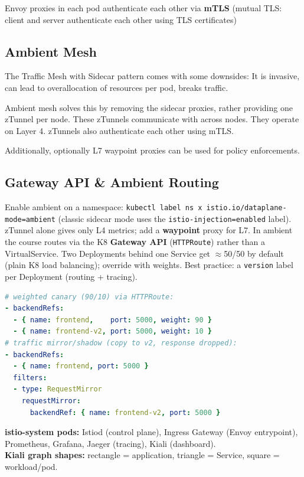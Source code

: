 Envoy proxies in each pod authenticate each other via \textbf{mTLS} (mutual TLS: client and server authenticate each other using TLS certificates)

\subsection{Ambient Mesh}
The Traffic Mesh with Sidecar pattern comes with some downsides: It is invasive, can lead to overallocation of resources per pod, breaks traffic.

Ambient mesh solves this by removing the sidecar proxies, rather providing one zTunnel per node. These zTunnels communicate with across nodes. They operate on Layer 4. zTunnels also authenticate each other using mTLS.

Additionally, optionally L7 waypoint proxies can be used for policy enforcements.

\subsection{Gateway API \& Ambient Routing}
Enable ambient on a namespace: \texttt{kubectl label ns x istio.io/dataplane-mode=ambient} (classic sidecar mode uses the \texttt{istio-injection=enabled} label). zTunnel alone gives only L4 metrics; add a \textbf{waypoint} proxy for L7. In ambient the course routes via the K8 \textbf{Gateway API} (\texttt{HTTPRoute}) rather than a VirtualService. Two Deployments behind one Service get $\approx$50/50 by default (plain K8 load balancing); override with weights. Best practice: a \texttt{version} label per Deployment (routing + tracing).
\begin{lstlisting}[language=yaml]
# weighted canary (90/10) via HTTPRoute:
- backendRefs:
  - { name: frontend,    port: 5000, weight: 90 }
  - { name: frontend-v2, port: 5000, weight: 10 }
# traffic mirror/shadow (copy to v2, response dropped):
- backendRefs:
  - { name: frontend, port: 5000 }
  filters:
  - type: RequestMirror
    requestMirror:
      backendRef: { name: frontend-v2, port: 5000 }
\end{lstlisting}
\textbf{istio-system pods:} Istiod (control plane), Ingress Gateway (Envoy entrypoint), Prometheus, Grafana, Jaeger (tracing), Kiali (dashboard). \\
\textbf{Kiali graph shapes:} rectangle = application, triangle = Service, square = workload/pod.

